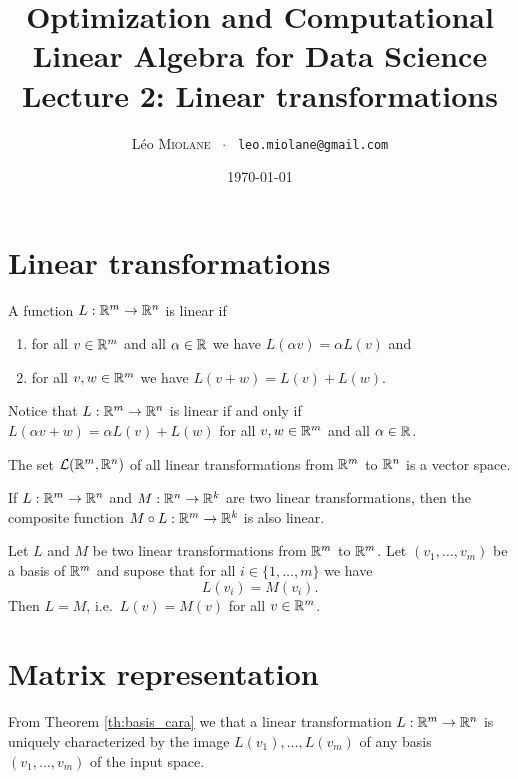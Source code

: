 \documentclass[11pt,nocut]{article}
\title{\vspace{-2.0cm}%
	Optimization and Computational Linear Algebra for Data Science\\
	Lecture 2: Linear transformations}
\author{Léo \textsc{Miolane} \ $\cdot$ \ \texttt{leo.miolane@gmail.com}}
\date{\today}
\begin{document}
\maketitle

\section{Linear transformations}

\begin{definition}
	A function $L: \mathbb{R}^m \to \mathbb{R}^n$ is linear if
	\begin{enumerate}[label=(\roman*)]
		\item for all $v \in \mathbb{R}^m$ and all $\alpha \in \mathbb{R}$ we have $L(\alpha v) = \alpha L(v)$ and
		\item for all $v,w \in \mathbb{R}^m$ we have $L(v + w) = L(v) + L(w)$.
	\end{enumerate}
\end{definition}

Notice that $L: \mathbb{R}^m \to \mathbb{R}^n$ is linear if and only if $L(\alpha v + w) = \alpha L(v) + L(w)$ for all $v,w \in \mathbb{R}^m$ and all $\alpha \in \mathbb{R}$.

\begin{proposition}
	The set $\mathcal{L}(\mathbb{R}^m, \mathbb{R}^n)$ of all linear transformations from $\mathbb{R}^m$ to $\mathbb{R}^n$ is a vector space.
\end{proposition}

\begin{proposition}
	If $L: \mathbb{R}^m \to \mathbb{R}^n$ and $M: \mathbb{R}^n \to \mathbb{R}^k$ are two linear transformations, then the composite function $M \circ L: \mathbb{R}^m \to \mathbb{R}^k$ is also linear.
\end{proposition}

\begin{theorem}\label{th:basis_cara}
	Let $L$ and $M$ be two linear transformations from $\mathbb{R}^m$ to $\mathbb{R}^m$.
	Let $(v_1, \dots, v_m)$ be a basis of $\mathbb{R}^m$ and supose that for all $i \in \{1, \dots,m\}$ we have
	$$
	L(v_i) = M(v_i).
	$$
	Then $L = M$, i.e.\ $L(v) = M(v)$ for all $v \in \mathbb{R}^m$.
\end{theorem}

\section{Matrix representation}

From Theorem \ref{th:basis_cara} we that a linear transformation $L: \mathbb{R}^m \to \mathbb{R}^n$ is uniquely characterized by the image $L(v_1), \dots, L(v_m)$ of any basis $(v_1, \dots, v_m)$ of the input space.
\end{document}
